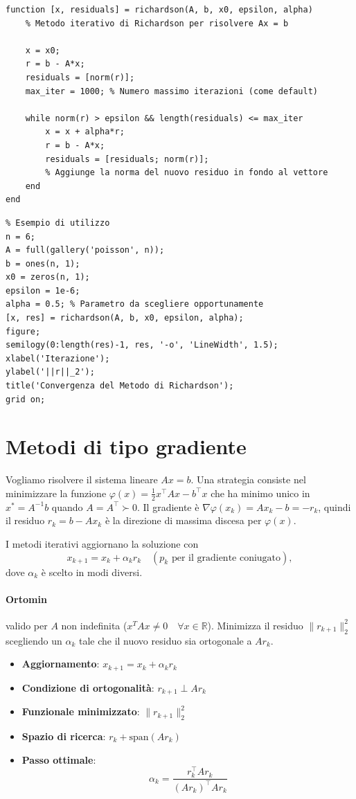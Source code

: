 \documentclass[12pt,a4paper]{article}
\begin{document}
\vspace{1em}
\begin{lstlisting}
function [x, residuals] = richardson(A, b, x0, epsilon, alpha)
    % Metodo iterativo di Richardson per risolvere Ax = b

    x = x0;
    r = b - A*x;
    residuals = [norm(r)];
    max_iter = 1000; % Numero massimo iterazioni (come default)
    
    while norm(r) > epsilon && length(residuals) <= max_iter
        x = x + alpha*r;
        r = b - A*x;
        residuals = [residuals; norm(r)];
        % Aggiunge la norma del nuovo residuo in fondo al vettore
    end
end
\end{lstlisting}

\begin{lstlisting}
% Esempio di utilizzo
n = 6;
A = full(gallery('poisson', n));
b = ones(n, 1);
x0 = zeros(n, 1);
epsilon = 1e-6;
alpha = 0.5; % Parametro da scegliere opportunamente
[x, res] = richardson(A, b, x0, epsilon, alpha);
figure;
semilogy(0:length(res)-1, res, '-o', 'LineWidth', 1.5);
xlabel('Iterazione');
ylabel('||r||_2');
title('Convergenza del Metodo di Richardson');
grid on;
\end{lstlisting}


\newpage
\section*{Metodi di tipo gradiente}

Vogliamo risolvere il sistema lineare \( Ax = b \). Una strategia consiste nel minimizzare la funzione
$\varphi(x) = \frac{1}{2} x^\top A x - b^\top x$
che ha minimo unico in \( x^* = A^{-1}b \) quando \( A = A^\top \succ 0 \).  
Il gradiente è \( \nabla \varphi(x_k) = A x_k - b = -r_k \), quindi il residuo \( r_k = b - A x_k \) è la direzione di massima discesa per \( \varphi(x) \).

I metodi iterativi aggiornano la soluzione con
\[
x_{k+1} = x_k + \alpha_k r_k \quad (p_k \text{ per il gradiente coniugato}),
\]
dove \( \alpha_k \) è scelto in modi diversi.

\paragraph{Ortomin}
 valido per \( A \) non indefinita ($x^TAx\ne0\quad\forall x \in \mathbb{R}$). Minimizza il residuo \( \|r_{k+1}\|_2^2 \) scegliendo un \( \alpha_k \) tale che il nuovo residuo sia ortogonale a \( A r_k \).
\begin{itemize}
    \item \textbf{Aggiornamento}: \( x_{k+1} = x_k + \alpha_k r_k \)
    \item \textbf{Condizione di ortogonalità}: \( r_{k+1} \perp A r_k \)
    \item \textbf{Funzionale minimizzato}: \( \|r_{k+1}\|_2^2 \)
    \item \textbf{Spazio di ricerca}: \( r_k + \text{span}(A r_k) \)
    \item \textbf{Passo ottimale}: 
    \[
    \alpha_k = \frac{r_k^\top A r_k}{(A r_k)^\top A r_k}
    \]
\end{itemize}
\end{document}
